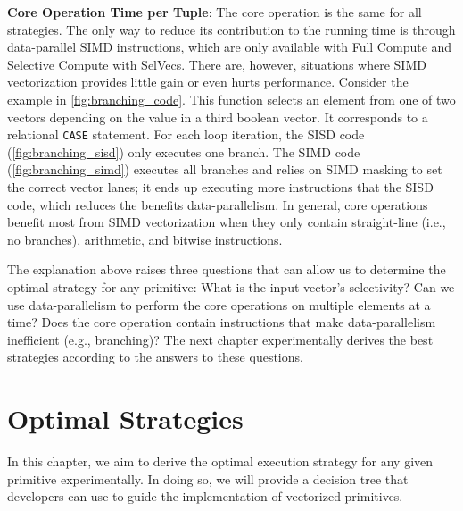 \documentclass[12pt]{cmuthesis}
\begin{document}
\textbf{Core Operation Time per Tuple}: The core operation is the same for all strategies. The only way to reduce its contribution to the running time is through data-parallel SIMD instructions, which are only available with Full Compute and Selective Compute with SelVecs. There are, however, situations where SIMD vectorization provides little gain or even hurts performance. Consider the example in \cref{fig:branching_code}. This function selects an element from one of two vectors depending on the value in a third boolean vector. It corresponds to a relational \texttt{CASE} statement. For each loop iteration, the SISD code (\cref{fig:branching_sisd}) only executes one branch. The SIMD code (\cref{fig:branching_simd}) executes all branches and relies on SIMD masking to set the correct vector lanes; it ends up executing more instructions that the SISD code, which reduces the benefits data-parallelism. In general, core operations benefit most from SIMD vectorization when they only contain straight-line (i.e., no branches), arithmetic, and bitwise instructions.

The explanation above raises three questions that can allow us to determine the optimal strategy for any primitive: What is the input vector's selectivity? Can we use data-parallelism to perform the core operations on multiple elements at a time? Does the core operation contain instructions that make data-parallelism inefficient (e.g., branching)? The next chapter experimentally derives the best strategies according to the answers to these questions.

\chapter{Optimal Strategies}
\label{chapter3}
In this chapter, we aim to derive the optimal execution strategy for any given primitive experimentally. In doing so, we will provide a decision tree that developers can use to guide the implementation of vectorized primitives.
\end{document}
